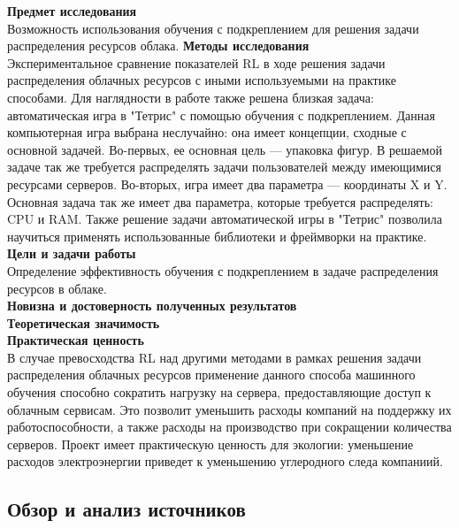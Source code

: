 \documentclass{article}
\begin{document}
\textbf{Предмет исследования}\\
Возможность использования обучения с подкреплением для решения задачи распределения ресурсов облака.
\textbf{Методы исследования}\\
Экспериментальное сравнение показателей RL в ходе решения задачи распределения облачных ресурсов с иными используемыми на практике способами. Для наглядности в работе также решена близкая задача: автоматическая игра в "Тетрис" с помощью обучения с подкреплением.  Данная компьютерная игра выбрана неслучайно: она имеет концепции, сходные с основной задачей. Во-первых, ее основная цель — упаковка фигур. В решаемой задаче так же требуется распределять задачи пользователей между имеющимися ресурсами серверов. Во-вторых, игра имеет два параметра — координаты X и Y. Основная задача так же имеет два параметра, которые требуется распределять: CPU и RAM. Также решение задачи автоматической игры в "Тетрис" позволила научиться применять использованные библиотеки и фреймворки на практике.\\
\textbf{Цели и задачи работы}\\
Определение эффективность обучения с подкреплением в задаче распределения ресурсов в облаке.\\
\textbf{Новизна и достоверность полученных результатов}\\
\textbf{Теоретическая значимость}\\
\textbf{Практическая ценность}\\
В случае превосходства RL над другими методами в рамках решения задачи распределения облачных ресурсов применение данного способа машинного обучения способно сократить нагрузку на сервера, предоставляющие доступ к облачным сервисам. Это позволит уменьшить расходы компаний на поддержку их работоспособности, а также расходы на производство при сокращении количества серверов. Проект имеет практическую ценность для экологии: уменьшение расходов электроэнергии приведет к уменьшению углеродного следа компаниий.	\\
\newpage
\begin{center}
\section {Обзор и анализ источников}
\end{center}
\end{document}
